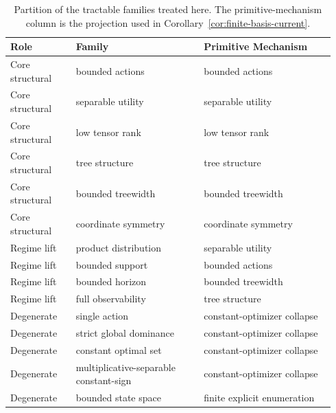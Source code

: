 \begin{table}[h]
\centering
\small
\setlength{\tabcolsep}{4pt}
\renewcommand{\arraystretch}{1.12}
\renewcommand{\tabularxcolumn}[1]{m{#1}}
\begin{tabularx}{\linewidth}{@{}>{\raggedright\arraybackslash}m{0.19\linewidth}>{\raggedright\arraybackslash}m{0.37\linewidth}>{\raggedright\arraybackslash}m{0.38\linewidth}@{}}
\toprule
\textbf{Role} & \textbf{Family} & \textbf{Primitive Mechanism} \\
\midrule
Core structural & bounded actions & bounded actions \\
\midrule
Core structural & separable utility & separable utility \\
\midrule
Core structural & low tensor rank & low tensor rank \\
\midrule
Core structural & tree structure & tree structure \\
\midrule
Core structural & bounded treewidth & bounded treewidth \\
\midrule
Core structural & coordinate symmetry & coordinate symmetry \\
\midrule
Regime lift & product distribution & separable utility \\
\midrule
Regime lift & bounded support & bounded actions \\
\midrule
Regime lift & bounded horizon & bounded treewidth \\
\midrule
Regime lift & full observability & tree structure \\
\midrule
Degenerate & single action & constant-optimizer collapse \\
\midrule
Degenerate & strict global dominance & constant-optimizer collapse \\
\midrule
Degenerate & constant optimal set & constant-optimizer collapse \\
\midrule
Degenerate & multiplicative-separable constant-sign & constant-optimizer collapse \\
\midrule
Degenerate & bounded state space & finite explicit enumeration \\
\bottomrule
\end{tabularx}
\caption{Partition of the tractable families treated here. The primitive-mechanism column is the projection used in Corollary~\ref{cor:finite-basis-current}.}
\label{tab:positive-landscape-partition}
\end{table}

